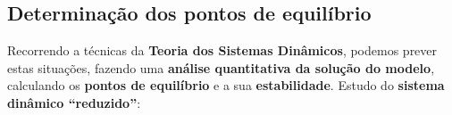 

\subsection{Determinação dos pontos de equilíbrio}
Recorrendo a técnicas da \textbf{Teoria dos Sistemas Dinâmicos}, podemos prever estas situações, fazendo uma \textbf{análise quantitativa da solução do modelo}, calculando os \textbf{pontos de equilíbrio} e a sua \textbf{estabilidade}.\newline
Estudo do \textbf{sistema dinâmico “reduzido”}:

